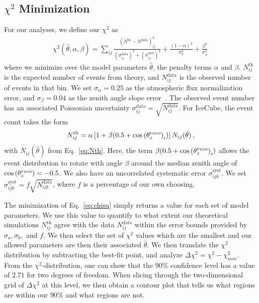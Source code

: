 \subsection{\texorpdfstring{$\chi^2$}{Chi-squared} Minimization}
For our analyses, we define our $\chi^2$ as
\begin{align} \label{eq:chisq}
    \chi^{2}(\hat{\theta},\alpha,\beta)=\sum_{ij} \frac{\left(N^\text{th}-N^\text{data}\right)_{ij}^{2}}
    {\left(\sigma^\text{data}_{ij}\right)^{2} + \left(\sigma^\text{syst}_{ij}\right)^{2}}+ 
    \frac{(1-\alpha)^2}{\sigma_\alpha^2} + \frac{\beta^2}{\sigma_\beta^2}\,
\end{align}
where we minimize over the model parameters $\hat{\theta}$, the penalty terms $\alpha$ and $\beta$.
$N_{ij}^\text{th}$ is the expected number of events from theory, and $N_{ij}^\text{data}$ is the observed number of events in that bin. 
We set $\sigma_\alpha = 0.25$ as the atmospheric flux normalization error, and $\sigma_\beta = 0.04$ as the zenith angle slope error~\cite{hondapaper}. 
The observed event number has an associated Poissonian uncertainty $\sigma_{ij}^\text{data} = \sqrt{N_{ij}^\text{data}}$.
For IceCube, the event count takes the form
\begin{align}
    N^\text{th}_{ij} = \alpha\left[1+\beta (0.5 + \cos{(\theta_z^{reco})}_i )\right] N_{ij}(\hat{\theta})\,,
\end{align}
with $N_{ij}(\hat{\theta})$ from Eq.~\ref{eq:Nth}. Here, the term $ \beta (0.5 + \cos{(\theta_z^{reco})}_i )$ allows the event distribution to rotate with angle $\beta$ around the median zenith angle of $\cos{(\theta_z^{reco})} = -0.5$.
We also have an uncorrelated systematic error $\sigma_{ijk}^\text{syst}$. We set $\sigma_{ijk}^\text{syst} = f\sqrt{N_{ijk}^\text{data}}$, where $f$ is a percentage of our own choosing.

The minimization of Eq.~\ref{eq:chisq} simply returns a value for each set of model parameters. We use this value to quantify to what extent
our theoretical simulations $N^\text{th}_{ij}$ agree with the data $N^\text{data}_{ij}$ within the error bounds provided by $\sigma_a,\sigma_b,$ and $f$.
We then select the set of $\chi^2$ values which are the smallest and our allowed parameters are then their associated $\hat{\theta}$.
We then translate the $\chi^2$ distribution by subtracting the best-fit point, and analyze $\Delta \chi^2 = \chi^2 - \chi^2_{min}$.
From the $\chi^2$-distribution, one can show that the $90\%$ confidence level has a value of $2.71$ for two degrees of freedom. When slicing through the 
two-dimensional grid of $\Delta \chi^2$ at this level, we then obtain a contour plot that tells us what regions are within our $90 \%$ and what regions are not.

